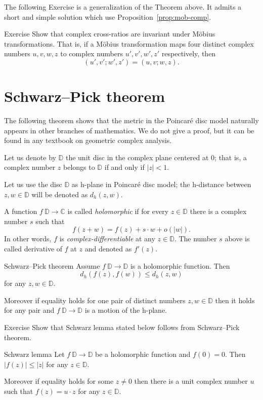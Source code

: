 The following Exercise is a generalization of the Theorem above.
It admits a short and simple solution which use Proposition~\ref{prop:mob-comp}.

\begin{thm}{Exercise}\label{ex:C-cross-ratio}
Show that 
complex cross-ratios are invariant under M\"obius transformations. 
That is, if a M\"obius transformation maps four distinct complex numbers $u, v, w, z$ to complex numbers $u', v', w', z'$ respectively, then
$$
(u',v';w',z')
=
(u,v;w,z).
$$

\end{thm}

\section*{Schwarz--Pick theorem}
The following theorem shows 
that the metric in the Poincar\'e disc model naturally appears in other branches of mathematics.
We do not give a proof, but it can be found in any textbook on geometric complex analysis.

Let us denote by $\mathbb{D}$
the unit disc in the complex plane centered at $0$;
that is, a complex number $z$
belongs to $\mathbb{D}$ if and only if $|z|<1$.

Let us use the disc $\mathbb{D}$ as h-plane in Poincar\'e disc model;
the h-distance between $z, w\in\mathbb{D}$ will be denoted as $d_h(z,w)$.

A function $f\:\mathbb{D}\to \mathbb{C}$ is called \emph{holomorphic} if for every $z\in \mathbb{D}$
there is a complex number $s$ such that
\[f(z+w)=f(z)+s\cdot w+o(|w|).\]
In other words, $f$ is {}\emph{complex-differentiable}
at any $z\in\mathbb{D}$.
The number $s$ above is called derivative of $f$ at $z$ and denoted as $f'(z)$.

\begin{thm}{Schwarz--Pick theorem}
Assume $f\: \mathbb{D}\to \mathbb{D}$ is a holomorphic function.
Then 
\[d_h(f(z),f(w))\le d_h(z,w)\]
for any $z,w\in \mathbb{D}$.

Moreover if equality holds for one pair of distinct numbers $z,w\in \mathbb{D}$ then it holds for any pair and  $f\: \mathbb{D}\to \mathbb{D}$ is a motion of the h-plane.
\end{thm}

\begin{thm}{Exercise}\label{ex:schwarz}
Show that Schwarz lemma stated below 
follows from Schwarz--Pick theorem.
\end{thm}

\begin{thm}{Schwarz lemma}
Let $f\: \mathbb{D}\to \mathbb{D}$ be a holomorphic function
and $f(0)=0$.
Then 
$|f(z)|\le |z|$
for any $z\in \mathbb{D}$.

Moreover if equality holds for some $z\ne 0$ then there is a unit complex number $u$ 
such that 
$f(z)=u\cdot z$
for any $z\in\mathbb{D}$.
\end{thm}






